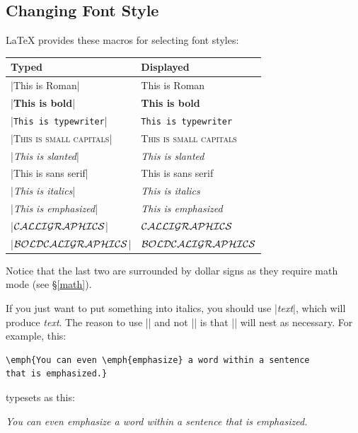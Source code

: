 \subsection{Changing Font Style}
\LaTeX{} provides these macros for selecting font styles:

\begin{center}
\begin{tabular}{l|l}
Typed                                  & Displayed\\\hline
|\textrm{This is Roman}|               & \textrm{This is Roman} \\
|\textbf{This is bold}|                & \textbf{This is bold}\\
|\texttt{This is typewriter}|          & \texttt{This is typewriter}\\
|\textsc{This is small capitals}|      & \textsc{This is small capitals}\\
|\textsl{This is slanted}|             & \textsl{This is slanted}\\
|\textsf{This is sans serif}|          & \textsf{This is sans serif}\\
|\textit{This is italics}|             & \textit{This is italics}\\
|\emph{This is emphasized}|            & \emph{This is emphasized}\\
|$\cal CALLIGRAPHICS$|                 & $\cal CALLIGRAPHICS$\\
|{\boldmath $\cal BOLD CALIGRAPHICS$}| & {\boldmath $\cal BOLD CALIGRAPHICS$}\\
\end{tabular}
\end{center}

Notice that the last two are surrounded by dollar signs as they require math mode (see \S\ref{math}).

If you just want to put something into italics, you should use |\emph{text}|,
which will produce \emph{text}. The reason to use |\emph{}| and not |\textit{}|
is that |\emph{}| will nest as necessary.  For example, this:

\begin{center}
\begin{Verbatim}
\emph{You can even \emph{emphasize} a word within a sentence
that is emphasized.}
\end{Verbatim}
\end{center}

typesets as this:

\begin{center}
\emph{You can even \emph{emphasize} a word within a sentence that is emphasized.}
\end{center}

